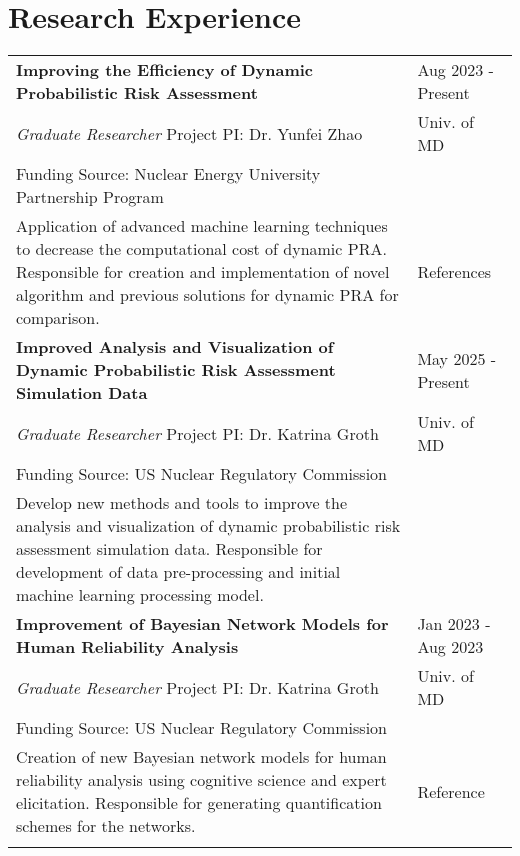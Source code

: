 \documentclass[letterpaper, 11pt]{article}
\begin{document}
\section{Research Experience}
\begin{table}[H]
    \centering
    \begin{tabular}{L{0.7\textwidth} R{0.2\textwidth}}
        \textbf{Improving the Efficiency of Dynamic Probabilistic Risk Assessment} & Aug 2023 - Present \\
        \hspace{5pt} \textit{Graduate Researcher} \hspace{25pt} Project PI: Dr. Yunfei Zhao & Univ. of MD\\
        \hspace{5pt} Funding Source: Nuclear Energy University Partnership Program & \\
        \hspace{5pt} Application of advanced machine learning techniques to decrease the computational cost of dynamic PRA.
        Responsible for creation and implementation of novel algorithm and previous solutions for dynamic PRA for comparison. & References \cite{Zhao2024RAMS,OLeary2024improving,OLeary2025sequential} \\

        \textbf{Improved Analysis and Visualization of Dynamic Probabilistic Risk Assessment Simulation Data} & May 2025 - Present \\
        \hspace{5pt} \textit{Graduate Researcher} \hspace{25pt} Project PI: Dr. Katrina Groth & Univ. of MD \\
        \hspace{5pt} Funding Source: US Nuclear Regulatory Commission & \\
        \hspace{5pt} Develop new methods and tools to improve the analysis and visualization of dynamic probabilistic risk assessment simulation data.
        Responsible for development of data pre-processing and initial machine learning processing model. & \\

        \textbf{Improvement of Bayesian Network Models for Human Reliability Analysis} & Jan 2023 - Aug 2023 \\
        \hspace{5pt} \textit{Graduate Researcher} \hspace{25pt} Project PI: Dr. Katrina Groth & Univ. of MD \\
        \hspace{5pt} Funding Source: US Nuclear Regulatory Commission & \\
        \hspace{5pt} Creation of new Bayesian network models for human reliability analysis using cognitive science and expert elicitation.
        Responsible for generating quantification schemes for the networks. & Reference \cite{OLeary2023survey} \\
        \hspace{5pt}
    \end{tabular}
\end{table}
\end{document}
